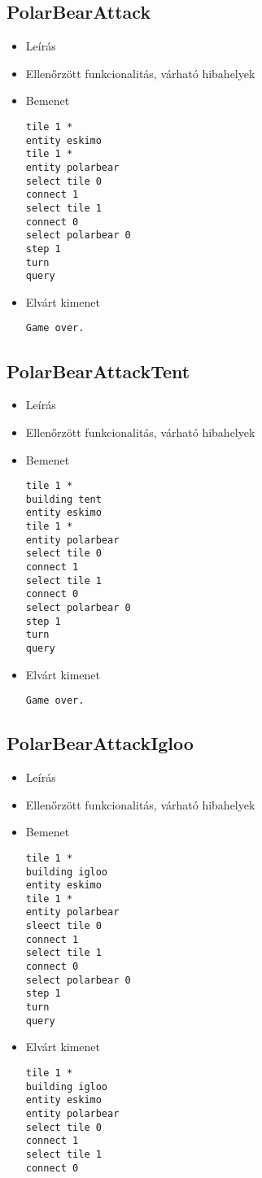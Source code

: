 \subsection{PolarBearAttack}
\begin{itemize}
\item Leírás\newline
\item Ellenőrzött funkcionalitás, várható hibahelyek
\item Bemenet
\begin{lstlisting}
tile 1 *
entity eskimo
tile 1 *
entity polarbear
select tile 0
connect 1
select tile 1
connect 0
select polarbear 0
step 1
turn
query
\end{lstlisting}
\item Elvárt kimenet
\begin{lstlisting}
Game over.
\end{lstlisting}
\end{itemize}

\subsection{PolarBearAttackTent}
\begin{itemize}
\item Leírás\newline
\item Ellenőrzött funkcionalitás, várható hibahelyek
\item Bemenet
\begin{lstlisting}
tile 1 *
building tent
entity eskimo
tile 1 *
entity polarbear
select tile 0
connect 1
select tile 1
connect 0
select polarbear 0
step 1
turn
query
\end{lstlisting}
\item Elvárt kimenet
\begin{lstlisting}
Game over.
\end{lstlisting}
\end{itemize}

\subsection{PolarBearAttackIgloo}
\begin{itemize}
\item Leírás\newline
\item Ellenőrzött funkcionalitás, várható hibahelyek
\item Bemenet
\begin{lstlisting}
tile 1 *
building igloo
entity eskimo
tile 1 *
entity polarbear
sleect tile 0
connect 1
select tile 1
connect 0
select polarbear 0
step 1
turn
query
\end{lstlisting}
\item Elvárt kimenet
\begin{lstlisting}
tile 1 *
building igloo
entity eskimo
entity polarbear
select tile 0
connect 1
select tile 1
connect 0
\end{lstlisting}
\end{itemize}

